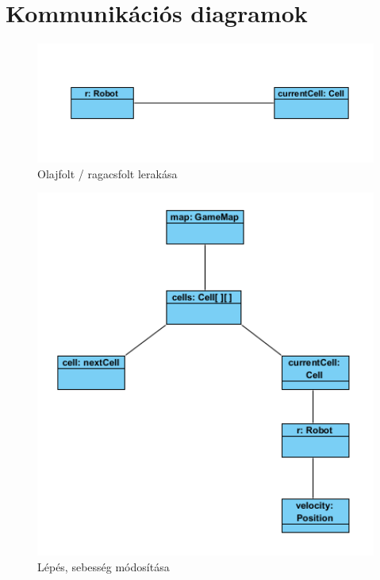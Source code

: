 \section{Kommunikációs diagramok}

\begin{figure}[!htbp]
	\begin{center}
		\includegraphics[width=13cm]{./chapters/chapter05/placetrapobject.png}
		\caption{Olajfolt / ragacsfolt lerakása}
	\end{center}
\end{figure}


\begin{figure}[!htbp]
	\begin{center}
		\includegraphics[width=13cm]{./chapters/chapter05/stepobject.png}
		\caption{Lépés, sebesség módosítása}
	\end{center}
\end{figure}
